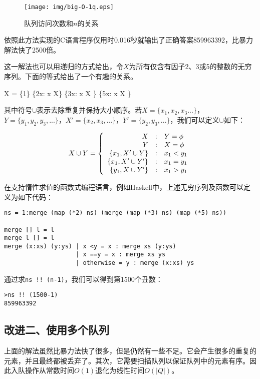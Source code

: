 \documentclass[UTF8]{article}
\begin{document}
\begin{figure}[htbp]
  \centering
  \texttt{[image: img/big-O-1q.eps]}
  \caption{队列访问次数和$n$的关系} \label{fig:big-O-1q}
\end{figure}

依照此方法实现的C语言程序仅用时0.016秒就输出了正确答案859963392，比暴力解法快了2500倍。

这一解法也可以用递归的方式给出，令$X$为所有仅含有因子2、3或5的整数的无穷序列。下面的等式给出了一个有趣的关系。

\be
  X = \{1\} \cup \{2x: \forall x \in X\} \cup \{3x: \forall x \in X \} \cup \{5x: \forall x \in X \}
\ee

其中符号$\cup$表示去除重复并保持大小顺序。若$X=\{x_1, x_2, x_3...\}$，$Y=\{y_1, y_2, y_3, ...\}$，$X' = \{x_2, x_3, ...\}$，$Y'=\{y_2, y_3, ...\}$，我们可以定义$\cup$如下：

\[
X \cup Y = \left \{
  \begin{array}{r@{\quad:\quad}l}
  X & Y = \phi \\
  Y & X = \phi \\
  \{ x_1, X' \cup Y \} & x_1 < y_1 \\
  \{ x_1, X' \cup Y' \} & x_1 = y_1 \\
  \{ y_1, X \cup Y' \} & x_1 > y_1
  \end{array}
\right.
\]

在支持惰性求值的函数式编程语言，例如Haskell中，上述无穷序列及函数可以定义为如下代码：

\begin{lstlisting}[style=Haskell]
ns = 1:merge (map (*2) ns) (merge (map (*3) ns) (map (*5) ns))

merge [] l = l
merge l [] = l
merge (x:xs) (y:ys) | x <y = x : merge xs (y:ys)
                    | x ==y = x : merge xs ys
                    | otherwise = y : merge (x:xs) ys
\end{lstlisting}

通过求\texttt{ns !! (n-1)}，我们可以得到第1500个丑数：

\begin{verbatim}
>ns !! (1500-1)
859963392
\end{verbatim}

\subsection{改进二、使用多个队列}
上面的解法虽然比暴力法快了很多，但是仍然有一些不足。它会产生很多的重复的元素，并且最终都被丢弃了。其次，它需要扫描队列以保证队列中的元素有序。因此入队操作从常数时间$O(1)$退化为线性时间$O(|Q|)$。
\end{document}
